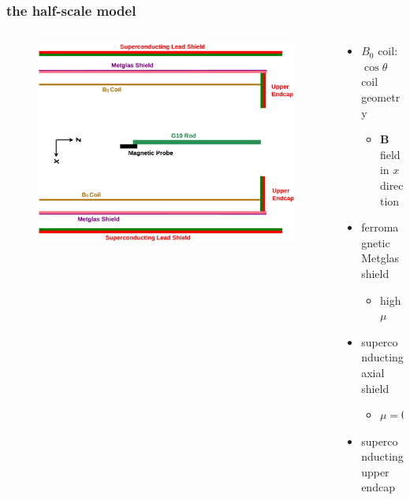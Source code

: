 \documentclass{beamer}
\renewcommand{\vec}{\mathbf}
\begin{document}
\begin{frame}
\frametitle{the half-scale model}

    \begin{columns}
    
    \begin{column}{0.5\textwidth}
    \begin{figure}
    \includegraphics[width=\textwidth, angle=90, trim=70px 70px 70px 70px]
    {figures/simplified_structure.eps}
    \end{figure}
    \end{column}

    \pause

    \begin{column}{0.5\textwidth}
    \begin{itemize}
        \item $B_0$ coil: $\cos\theta$ coil geometry \pause
            \begin{itemize}
                \item $\vec{B}$ field in $x$ direction \pause
            \end{itemize}
        \bigskip
        \item ferromagnetic Metglas shield\pause
            \begin{itemize}
                \item high $\mu$ \pause
            \end{itemize}
        \item superconducting axial shield \pause
            \begin{itemize}
                \item $\mu = 0$ \pause
            \end{itemize}
        \bigskip
        \item superconducting upper endcap
    \end{itemize}
    \end{column}

    \end{columns}

\end{frame}
\end{document}
